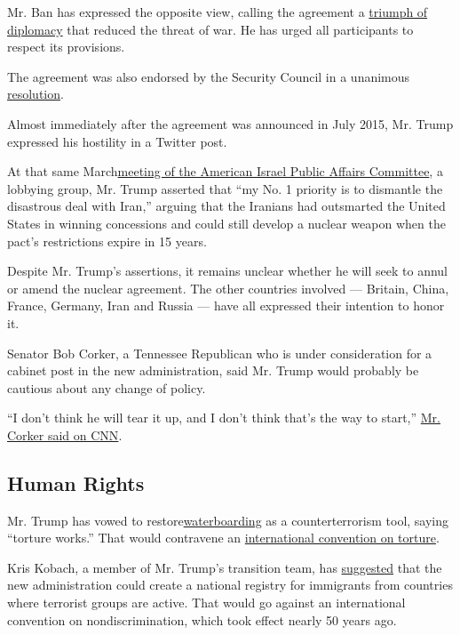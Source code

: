 Mr. Ban has expressed the opposite view, calling the agreement a
\href{https://www.un.org/sg/en/content/sg/statement/2016-07-20/statement-secretary-general-occasion-first-anniversary-adoption}{triumph
of diplomacy} that reduced the threat of war. He has urged all
participants to respect its provisions.

The agreement was also endorsed by the Security Council in a unanimous
\href{http://www.un.org/en/ga/search/view_doc.asp?symbol=S/RES/2231(2015)}{resolution}.

Almost immediately after the agreement was announced in July 2015, Mr.
Trump expressed his hostility in a Twitter post.

At that same
March\href{http://time.com/4267058/donald-trump-aipac-speech-transcript/}{meeting
of the American Israel Public Affairs Committee}, a lobbying group, Mr.
Trump asserted that ``my No. 1 priority is to dismantle the disastrous
deal with Iran,'' arguing that the Iranians had outsmarted the United
States in winning concessions and could still develop a nuclear weapon
when the pact's restrictions expire in 15 years.

Despite Mr. Trump's assertions, it remains unclear whether he will seek
to annul or amend the nuclear agreement. The other countries involved
--- Britain, China, France, Germany, Iran and Russia --- have all
expressed their intention to honor it.

Senator Bob Corker, a Tennessee Republican who is under consideration
for a cabinet post in the new administration, said Mr. Trump would
probably be cautious about any change of policy.

``I don't think he will tear it up, and I don't think that's the way to
start,''
\href{http://www.cnn.com/2016/11/16/politics/bob-corker-donald-trump-iran-deal/}{Mr.
Corker said on CNN}.

\hypertarget{human-rights}{%
\subsection{Human Rights}\label{human-rights}}

Mr. Trump has vowed to
restore\href{https://www.washingtonpost.com/news/post-politics/wp/2016/02/17/donald-trump-on-waterboarding-torture-works/}{waterboarding}
as a counterterrorism tool, saying ``torture works.'' That would
contravene an
\href{http://www.ohchr.org/EN/ProfessionalInterest/Pages/CAT.aspx}{international
convention on torture}.

Kris Kobach, a member of Mr. Trump's transition team, has
\href{http://www.reuters.com/article/us-usa-trump-immigration-idUSKBN13B05C}{suggested}
that the new administration could create a national registry for
immigrants from countries where terrorist groups are active. That would
go against an international convention on nondiscrimination, which took
effect nearly 50 years ago.

